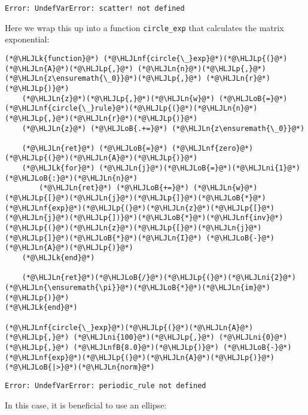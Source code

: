 \documentclass[12pt,a4paper]{article}
\newcommand{\HLJLk}[1]{\textcolor[RGB]{148,91,176}{\textbf{#1}}}
\newcommand{\HLJLn}[1]{#1}
\newcommand{\HLJLnf}[1]{\textcolor[RGB]{66,102,213}{#1}}
\newcommand{\HLJLnfB}[1]{\textcolor[RGB]{59,151,46}{#1}}
\newcommand{\HLJLni}[1]{\textcolor[RGB]{59,151,46}{#1}}
\newcommand{\HLJLoB}[1]{\textcolor[RGB]{102,102,102}{\textbf{#1}}}
\newcommand{\HLJLp}[1]{#1}
\begin{document}
\begin{lstlisting}
Error: UndefVarError: scatter! not defined
\end{lstlisting}


Here we wrap this up into a function \texttt{circle\_exp} that calculates the matrix exponential:


\begin{lstlisting}
(*@\HLJLk{function}@*) (*@\HLJLnf{circle{\_}exp}@*)(*@\HLJLp{(}@*)(*@\HLJLn{A}@*)(*@\HLJLp{,}@*) (*@\HLJLn{n}@*)(*@\HLJLp{,}@*) (*@\HLJLn{z\ensuremath{\_0}}@*)(*@\HLJLp{,}@*) (*@\HLJLn{r}@*)(*@\HLJLp{)}@*)
    (*@\HLJLn{z}@*)(*@\HLJLp{,}@*)(*@\HLJLn{w}@*) (*@\HLJLoB{=}@*) (*@\HLJLnf{circle{\_}rule}@*)(*@\HLJLp{(}@*)(*@\HLJLn{n}@*)(*@\HLJLp{,}@*)(*@\HLJLn{r}@*)(*@\HLJLp{)}@*)
    (*@\HLJLn{z}@*) (*@\HLJLoB{.+=}@*) (*@\HLJLn{z\ensuremath{\_0}}@*)

    (*@\HLJLn{ret}@*) (*@\HLJLoB{=}@*) (*@\HLJLnf{zero}@*)(*@\HLJLp{(}@*)(*@\HLJLn{A}@*)(*@\HLJLp{)}@*)
    (*@\HLJLk{for}@*) (*@\HLJLn{j}@*)(*@\HLJLoB{=}@*)(*@\HLJLni{1}@*)(*@\HLJLoB{:}@*)(*@\HLJLn{n}@*)
        (*@\HLJLn{ret}@*) (*@\HLJLoB{+=}@*) (*@\HLJLn{w}@*)(*@\HLJLp{[}@*)(*@\HLJLn{j}@*)(*@\HLJLp{]}@*)(*@\HLJLoB{*}@*)(*@\HLJLnf{exp}@*)(*@\HLJLp{(}@*)(*@\HLJLn{z}@*)(*@\HLJLp{[}@*)(*@\HLJLn{j}@*)(*@\HLJLp{])}@*)(*@\HLJLoB{*}@*)(*@\HLJLnf{inv}@*)(*@\HLJLp{(}@*)(*@\HLJLn{z}@*)(*@\HLJLp{[}@*)(*@\HLJLn{j}@*)(*@\HLJLp{]}@*)(*@\HLJLoB{*}@*)(*@\HLJLn{I}@*) (*@\HLJLoB{-}@*) (*@\HLJLn{A}@*)(*@\HLJLp{)}@*)
    (*@\HLJLk{end}@*)

    (*@\HLJLn{ret}@*)(*@\HLJLoB{/}@*)(*@\HLJLp{(}@*)(*@\HLJLni{2}@*)(*@\HLJLn{\ensuremath{\pi}}@*)(*@\HLJLoB{*}@*)(*@\HLJLn{im}@*)(*@\HLJLp{)}@*)
(*@\HLJLk{end}@*)
   
(*@\HLJLnf{circle{\_}exp}@*)(*@\HLJLp{(}@*)(*@\HLJLn{A}@*)(*@\HLJLp{,}@*) (*@\HLJLni{100}@*)(*@\HLJLp{,}@*) (*@\HLJLni{0}@*)(*@\HLJLp{,}@*) (*@\HLJLnfB{8.0}@*)(*@\HLJLp{)}@*) (*@\HLJLoB{-}@*)(*@\HLJLnf{exp}@*)(*@\HLJLp{(}@*)(*@\HLJLn{A}@*)(*@\HLJLp{)}@*) (*@\HLJLoB{|>}@*)(*@\HLJLn{norm}@*)
\end{lstlisting}

\begin{lstlisting}
Error: UndefVarError: periodic_rule not defined
\end{lstlisting}


In this case, it is beneficial to use an ellipse:
\end{document}
